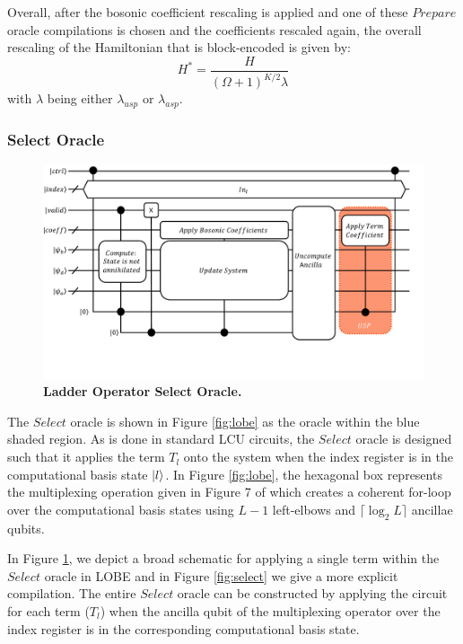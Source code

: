 Overall, after the bosonic coefficient rescaling is applied and one of these $Prepare$ oracle compilations is chosen and the coefficients rescaled again, the overall rescaling of the Hamiltonian that is block-encoded is given by:
\begin{equation}
    H^* = \frac{H}{(\Omega + 1)^{K/2} \lambda}
\end{equation}
with $\lambda$ being either $\lambda_{usp}$ or $\lambda_{asp}$.

\subsubsection{Select Oracle}
\label{subsubsec:select}

\begin{figure}
    \centering
    \includegraphics[width=16cm]{figures/select-broad.pdf}
    \caption{\textbf{Ladder Operator Select Oracle.}
    }
    \label{fig:select-broad}
\end{figure}

The $Select$ oracle is shown in Figure \ref{fig:lobe} as the oracle within the blue shaded region.
As is done in standard LCU circuits, the $Select$ oracle is designed such that it applies the term $T_l$ onto the system when the index register is in the computational basis state $\ket{l}$.
In Figure \ref{fig:lobe}, the hexagonal box represents the multiplexing operation given in Figure 7 of \cite{babbush2018encoding} which creates a coherent for-loop over the computational basis states using $L - 1$ left-elbows and $\lceil \log_2{L} \rceil$ ancillae qubits.

In Figure \ref{fig:select-broad}, we depict a broad schematic for applying a single term within the $Select$ oracle in LOBE and in Figure \ref{fig:select} we give a more explicit compilation.
The entire $Select$ oracle can be constructed by applying the circuit for each term ($T_l$) when the ancilla qubit of the multiplexing operator over the index register is in the corresponding computational basis state.

